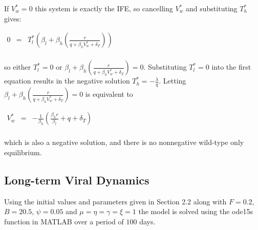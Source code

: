 \documentclass[11pt, oneside]{article}    %
\begin{document}
\vspace{5mm}

If $V_w^* = 0$ this system is exactly the IFE, so cancelling $V_w^*$ and substituting $T_h^*$ gives:

\vspace{5mm}

\begin{center}
$\begin{array}{rcl}
 0 & = &  T_l^* ( \beta_l + \beta_h ( \frac{r}{q+\beta_h V_w^*  + \delta_T} ))\\
\end{array}$
\end{center}

\vspace{5mm}

so either  $T_l^* = 0$ or $\beta_l + \beta_h ( \frac{r}{q+\beta_h V_w^*  + \delta_T})  = 0$. Substituting $T_l^* = 0$ into the first equation results in the negative solution $T_h^* = -\frac{\lambda}{q}$. Letting $\beta_l + \beta_h ( \frac{r}{q+\beta_h V_w^*  + \delta_T})  = 0$ is equivalent to 

\vspace{5mm}

\begin{center}
$\begin{array}{rcl}
 V_w^* & = & -\frac{1}{\beta_h}(\frac{\beta_h r}{\beta_l} + q + \delta_T)     \\
\end{array}$
\end{center}

\vspace{5mm}

which is also a negative solution, and there is no nonnegative wild-type only equilibrium.

\subsection{Long-term Viral Dynamics}

Using the initial values and parameters given in Section 2.2 along with $F=0.2$, $B=20.5$, $\psi = 0.05$ and $\mu = \eta = \gamma = \xi = 1$ the model is solved using the ode15s function in MATLAB over a period of $100$ days. 
\end{document}
